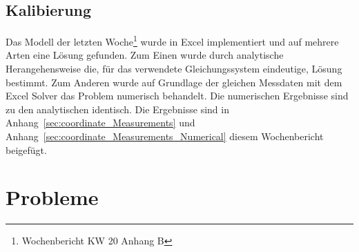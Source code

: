 \documentclass[a4paper,10pt,fleqn]{article}
\begin{document}
\subsection{Kalibierung}
Das Modell der letzten Woche\footnote{Wochenbericht KW 20 Anhang B} wurde in Excel implementiert und auf mehrere Arten eine Lösung gefunden. Zum Einen wurde durch analytische Herangehensweise die, für das verwendete Gleichungssystem eindeutige, Lösung bestimmt. Zum Anderen wurde auf Grundlage der gleichen Messdaten mit dem Excel Solver das Problem numerisch behandelt. Die numerischen Ergebnisse sind zu den analytischen identisch. Die Ergebnisse sind in Anhang~\ref{sec:coordinate_Measurements} und Anhang~\ref{sec:coordinate_Measurements_Numerical} diesem Wochenbericht beigefügt.
\section[Probleme]{Probleme}



\newpage


\end{document}
